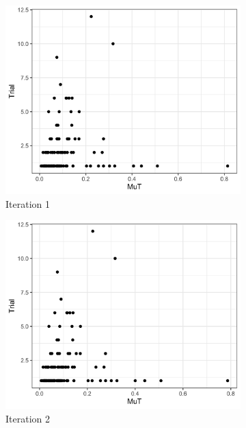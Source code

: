 \documentclass[11pt]{article}
\begin{document}
\begin{figure}[H]
  \centering
    \begin{subfigure}[b]{0.45\textwidth}
      \includegraphics[width=\textwidth]{../../../output/figures/Optimization/mut_data_0.png}
      \caption{Iteration 1}
      \label{fig:f1}
    \end{subfigure}
    \hfill
    \begin{subfigure}[b]{0.45\textwidth}
      \includegraphics[width=\textwidth]{../../../output/figures/Optimization/mut_data_1.png}
      \caption{Iteration 2}

    \end{subfigure}
    \begin{subfigure}[b]{0.45\textwidth}


\end{subfigure}
\end{figure}
\end{document}
